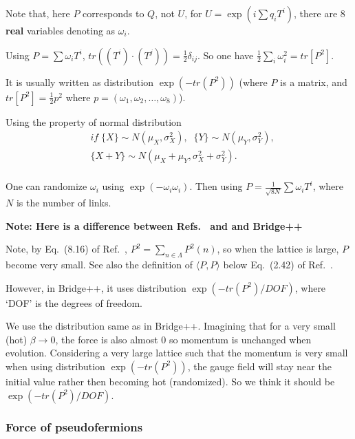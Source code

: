 Note that, here $P$ corresponds to $Q$, not $U$, for $U=\exp\left(i \sum q_i T^i\right)$, there are $8$ \textbf{real} variables denoting as $\omega _i$.

Using $P=\sum \omega _i T^i$, $tr((T^i)\cdot (T^j))=\frac{1}{2}\delta _{ij}$. So one have $\frac{1}{2}\sum _i\omega _i^2=tr[P^2]$.

It is usually written as distribution $\exp \left(-tr(P^2)\right)$ (where $P$ is a matrix, and $tr[P^2]=\frac{1}{2}p^2$ where $p=(\omega_1,\omega_2,\ldots ,\omega _8)$).

Using the property of normal distribution
\begin{equation}
\begin{split}
&if\; \{X\}\sim N(\mu _X, \sigma _X^2),\;\; \{Y\}\sim N(\mu _Y, \sigma _Y^2),\\
&\{X+Y\}\sim N(\mu _X+\mu _Y, \sigma _X^2+\sigma _Y^2).\\
\end{split}
\end{equation}

One can randomize $\omega _i$ using $\exp \left(-\omega_i\omega_i\right)$. Then using $P=\frac{1}{\sqrt{8N}}\sum \omega _i T^i$, where $N$ is the number of links.

\textcolor[rgb]{1,0,0}{\textbf{Note: Here is a difference between Refs.~\cite{latticeqcdbook2010} and \cite{latticeqcdbook2017} and Bridge++~\cite{bridge}}}

Note, by Eq.~(8.16) of Ref.~\cite{latticeqcdbook2010}, $P^2=\sum _{n\in \Lambda}P^2(n)$, so when the lattice is large, $P$ become very small. See also the definition of $\langle P,P\rangle$ below Eq.~(2.42) of Ref.~\cite{latticeqcdbook2017}.

However, in Bridge++, it uses distribution $\exp \left(-tr(P^2)/DOF\right)$, where `DOF' is the degrees of freedom.

We use the distribution same as in Bridge++. Imagining that for a very small (hot) $\beta \to 0$, the force is also almost $0$ so momentum is unchanged when evolution. Considering a very large lattice such that the momentum is very small when using distribution $\exp \left(-tr(P^2)\right)$, the gauge field will stay near the initial value rather then becoming hot (randomized). So we think it should be $\exp \left(-tr(P^2)/DOF\right)$.

\subsubsection{\label{forceOfPseudofermions}Force of pseudofermions}

